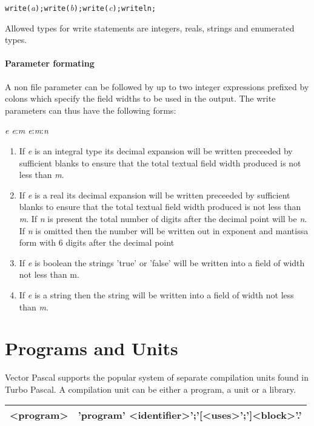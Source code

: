 {\texttt{write(}\emph{a}\texttt{);write(}\emph{b}\texttt{);write(}\emph{c}\texttt{);writeln; }

Allowed types for write statements are integers, reals, strings and enumerated
types.


\subsubsection{Parameter formating }

A non file parameter can be followed by up to two integer expressions prefixed
by colons which specify the field widths to be used in the output. The write
parameters can thus have the following forms: 

\emph{e e}:\emph{m e}:\emph{m}:\emph{n }

\begin{enumerate}
\item If \emph{e} is an integral type its decimal expansion will be written preceeded
by sufficient blanks to ensure that the total textual field width produced is
not less than \emph{m}. 
\item If \emph{e} is a real its decimal expansion will be written preceeded by sufficient
blanks to ensure that the total textual field width produced is not less than
\emph{m}. If \emph{n} is present the total number of digits after the decimal
point will be \emph{n}. If \emph{n} is omitted then the number will be written
out in exponent and mantissa form with 6 digits after the decimal point
\item If \emph{e} is boolean the strings 'true' or 'false' will be written into a
field of width not less than m. 
\item If \emph{e} is a string then the string will be written into a field of width
not less than \emph{m}.
\end{enumerate}

\chapter{Programs and Units}
\label{progunit}
Vector Pascal supports the popular system of separate compilation units
found in Turbo Pascal. A compilation unit can be either
a program, a unit or a library.

\vspace{0.3cm}
{\centering \begin{tabular}{|c|c|}
\hline 
<program>&
'program' <identifier>';'{[}<uses>';'{]}<block>'.'\\
\hline 
\end{tabular}\par}
\vspace{0.3cm}

}
